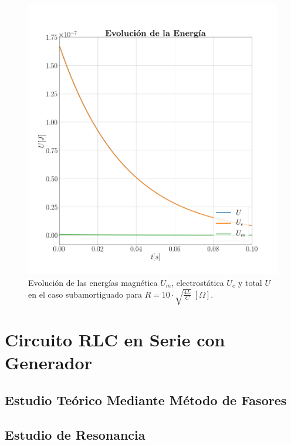 \documentclass[journal]{IEEEtran}
\begin{document}
\begin{figure}[!htb]
    \centering
    \includegraphics[width=\linewidth,trim={40 70 70 70},clip]{energiasobreamortiguado.png}
    \caption{Evolución de las energías magnética $U_m$, electrostática $U_e$ y total $U$ en el caso subamortiguado para $R=10 \cdot\sqrt{\frac{4L}{C}}~[\Omega]$.}
    \label{fig:intensidadamortiguado}
\end{figure}

\section{Circuito RLC en Serie con Generador}
\label{sec:rlcnogenerador}

\subsection{Estudio Teórico Mediante Método de Fasores}
\label{subsec:estudioteorico}

\subsection{Estudio de Resonancia}
\label{subsec:estudioresonancia}
\end{document}

